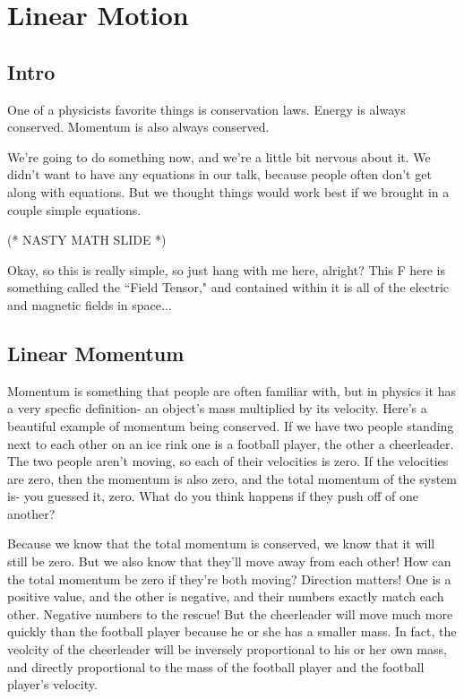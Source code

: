 \documentclass[12pt]{article}
\begin{document}
\section{Linear Motion}
\subsection{Intro}
One of a physicists favorite things is conservation 
laws. Energy is always conserved. Momentum is also always conserved. 

We're going to do something now, and we're a little bit nervous about it.
We didn't want to have any equations in our talk, because people often 
don't get along with equations. But we thought things would work best 
if we brought in a couple simple equations. 

(* NASTY MATH SLIDE *)

Okay, so this is really simple, so just hang with me here, alright? 
This F here is something called the ``Field Tensor," and 
contained within it is all of the electric and magnetic fields in space... 
\subsection{Linear Momentum}
Momentum is something
that people are often familiar with, but in physics it has a very specfic definition-
an object's mass multiplied by its velocity.
Here's a beautiful example of momentum being conserved. If we have two people standing next to each other on 
an ice rink one is a football player, the other a cheerleader. The two people aren't moving,
so each of their velocities is zero. If the velocities are zero, then the momentum is 
also zero, and the total momentum of the system is- you guessed it, zero. 
What do you think happens if they push off of one another? 

Because we know that the total momentum is conserved, we know that it will still be zero.
But we also know that they'll move away from each other! How can the total momentum be
zero if they're both moving? Direction matters! One is a positive value, and the other
is negative, and their numbers exactly match each other. Negative numbers to the 
rescue!
But the cheerleader will move much more quickly
than the football player because he or she has a smaller mass. In fact, the veolcity 
of the cheerleader will be inversely proportional to his or her own mass, and directly 
proportional to the mass of the football player and the football player's velocity. 
\end{document}
